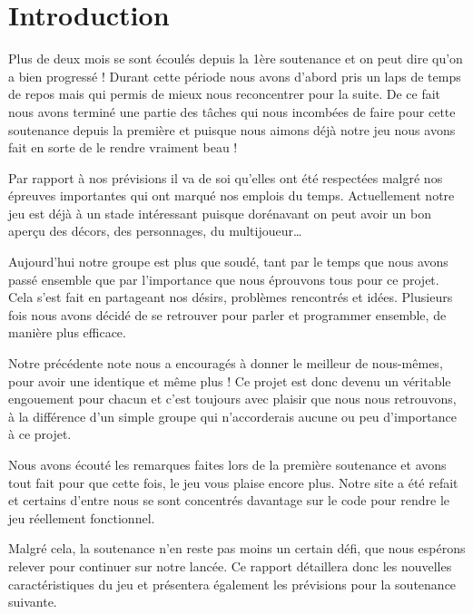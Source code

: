 \documentclass{article}
\begin{document}
\section{Introduction}
\par
Plus de deux mois se sont écoulés depuis la 1ère soutenance et on peut dire qu’on a bien progressé !
Durant cette période nous avons d’abord pris un laps de temps de repos mais qui permis de mieux nous reconcentrer pour la suite.
De ce fait nous avons terminé une partie des tâches qui nous incombées de faire pour cette soutenance depuis la première et puisque nous aimons déjà notre jeu nous avons fait en sorte de le rendre vraiment beau !
\newline
\par
Par rapport à nos prévisions il va de soi qu’elles ont été respectées malgré nos épreuves importantes qui ont marqué nos emplois du temps.
Actuellement notre jeu est déjà à un stade intéressant puisque dorénavant on peut avoir un bon aperçu des décors, des personnages, du multijoueur…
\newline
\par
Aujourd’hui notre groupe est plus que soudé, tant par le temps que nous avons passé ensemble  que par  l'importance que nous éprouvons tous pour ce projet. Cela s’est fait en partageant nos désirs, problèmes rencontrés et idées. Plusieurs fois nous avons décidé de se retrouver pour parler et programmer ensemble, de manière plus efficace. 
\newline
\par
Notre précédente note nous a encouragés à donner le meilleur de nous-mêmes, pour avoir une identique et même plus ! Ce projet est donc devenu un véritable engouement pour chacun et c’est toujours avec plaisir que nous nous retrouvons, à la différence d’un simple groupe qui n’accorderais aucune ou peu d’importance à ce projet.
\newline
\par
Nous avons écouté les remarques faites lors de la première soutenance et avons tout fait pour que cette fois, le jeu vous plaise encore plus. Notre site a été refait et certains d’entre nous se sont concentrés davantage sur le code pour rendre le jeu réellement fonctionnel.
\newline
\par
Malgré cela, la soutenance n'en reste pas moins un certain défi, que nous espérons relever pour continuer sur notre lancée.
Ce rapport détaillera donc les nouvelles caractéristiques du jeu et présentera également les prévisions pour la soutenance suivante.
\newpage
\end{document}
